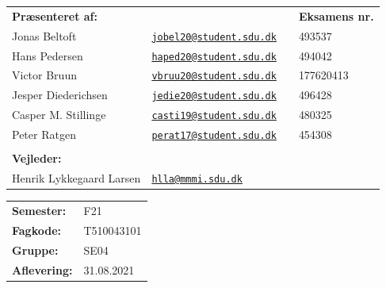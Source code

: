 \begin{titlepage}
\begin{center}
        \begin{table}[!h]
            \centering
            \begin{tabular}{llcl}
            \textbf{Præsenteret af:}    & &\qquad\qquad\qquad &
            \textbf{Eksamens nr.}\\
                        Jonas Beltoft & \href{jobel20@student.sdu.dk}{\texttt{jobel20@student.sdu.dk}}  %
                &   &  493537\\ %
                Hans Pedersen            & 
                \href{haped20@student.sdu.dk}{\texttt{haped20@student.sdu.dk}}  
                &   & 494042\\
                Victor Bruun            & \href{mailto:vbruu20@student.sdu.dk}{\texttt{vbruu20@student.sdu.dk}}  
                &   & 177620413\\
                Jesper Diederichsen     & \href{mailto:jedie20@student.sdu.dk}{\texttt{jedie20@student.sdu.dk}}  
                &   & 496428\\
                Casper M. Stillinge     & \href{mailto:casti19@student.sdu.dk}{\texttt{casti19@student.sdu.dk}}  
                &    & 480325 \\
                Peter Ratgen             & \href{mailto:perat17@student.sdu.dk}{\texttt{perat17@student.sdu.dk}}  
                &   & 454308  \\
                \vspace{1mm}\\ %
                \textbf{Vejleder:}      & &\qquad\qquad\qquad & \\
                Henrik Lykkegaard Larsen       & 
                \href{mailto:hlla@mmmi.sdu.dk}{\texttt{hlla@mmmi.sdu.dk}}              &   & \\
            \end{tabular}
        \end{table}
        
        \vfill
        \begin{table}[h!]
            \centering
            \begin{tabular}{ll}
            \textbf{Semester:} &F21\\
            \textbf{Fagkode:} &T510043101\\
            \textbf{Gruppe:} &SE04\\
            \textbf{Aflevering:} &31.08.2021\\
            \end{tabular}
        \end{table}
        
    \end{center}
\end{titlepage}
\clearpage